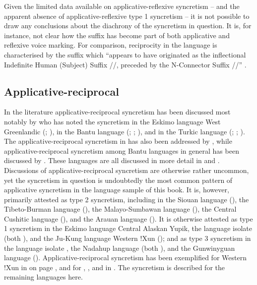 Given the limited data available on applicative-reflexive syncretism -- and the apparent absence of applicative-reflexive type 1 syncretism -- it is not possible to draw any conclusions about the diachrony of the syncretism in question. It is, for instance, not clear how the  suffix  has become part of both applicative and reflexive voice marking. For comparison, reciprocity in the language is characterised by the suffix  which “appears to have originated as the inflectional Indefinite Human (Subject) Suffix //, preceded by the N-Connector Suffix //” \citep[376]{morgan:1991}.

\subsection{Applicative-reciprocal} \label{sec:simple-syncretism:appl-recp}
In the literature applicative-reciprocal syncretism has been discussed most notably by \citeauthor{nedjalkov:2007a} who has noted the syncretism in the Eskimo language West Greenlandic (; \citeyear[174]{nedjalkov:2007c}), in the Bantu language  (; \citeyear[42]{nedjalkov:2007b}; \citeyear[275]{nedjalkov:2007d}), and in the Turkic language  (; \citeyear[237]{nedjalkov:2007d}; \citealt{nedjalkov:nedjalkov:2007}). The applicative-reciprocal syncretism in  has also been addressed by \citet{maslova:2007}, while applicative-reciprocal syncretism among Bantu languages in general has been discussed by \citet{bostoen:al:2015}. These languages are all discussed in more detail in  and . Discussions of applicative-reciprocal syncretism are otherwise rather uncommon, yet the syncretism in question is undoubtedly the most common pattern of applicative syncretism in the language sample of this book. It is, however, primarily attested as type 2 syncretism, including in the Siouan language  (), the Tibeto-Burman language  (), the Malayo-Sumbawan language  (), the Central Cushitic language  (), and the Arauan language  (). It is otherwise attested as type 1 syncretism in the Eskimo language Central Alaskan Yupik, the language isolate  (both ), and the Ju-Kung language Western !Xun (); and as type 3 syncretism in the language isolate , the Nadahup language  (both ), and the Gunwinyguan language  (). Applicative-reciprocal syncretism has been exemplified for Western !Xun in  on page \pageref{tab:ch3:type1a-examples-1}, and for , , and  in . The syncretism is described for the remaining languages here.

